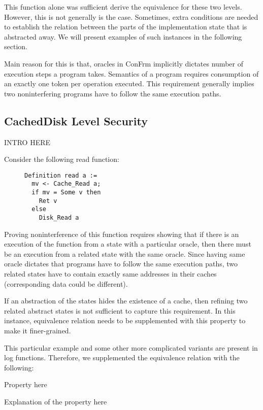 This function alone was sufficient derive the equivalence for these two levels. However, this is not generally is the case. Sometimes, extra conditions are needed to establish the relation between the parts of the implementation state that is abstracted away. We will present examples of such instances in the following section.

Main reason for this is that, oracles in ConFrm implicitly dictates number of execution steps a program takes. Semantics of a program requires consumption of an exactly one token per operation executed. This requirement generally implies two noninterfering programs have to follow the same execution paths. 


\subsection{CachedDisk Level Security}
{\color{red} INTRO HERE}

Consider the following read function:

\begin{figure}[ht]
    \centering
\begin{verbatim}
Definition read a :=
  mv <- Cache_Read a;
  if mv = Some v then 
    Ret v
  else
    Disk_Read a
\end{verbatim}
    \label{fig:refines_related}
\end{figure}
%
Proving noninterference of this function requires showing that if there is an execution of the function from a state with a particular oracle, then there must be an execution from a related state with the same oracle. Since having same oracle dictates that programs have to follow the same execution paths, two related states have to contain exactly same addresses in their caches (corresponding data could be different).

If an abstraction of the states hides the existence of a cache, then refining two related abstract states is not sufficient to capture this requirement. In this instance, equivalence relation needs to be supplemented with this property to make it finer-grained.

This particular example and some other more complicated variants are present in log functions. Therefore, we supplemented the equivalence relation with the following:

{\color{red} Property here}

{\color{red} Explanation of the property here}


